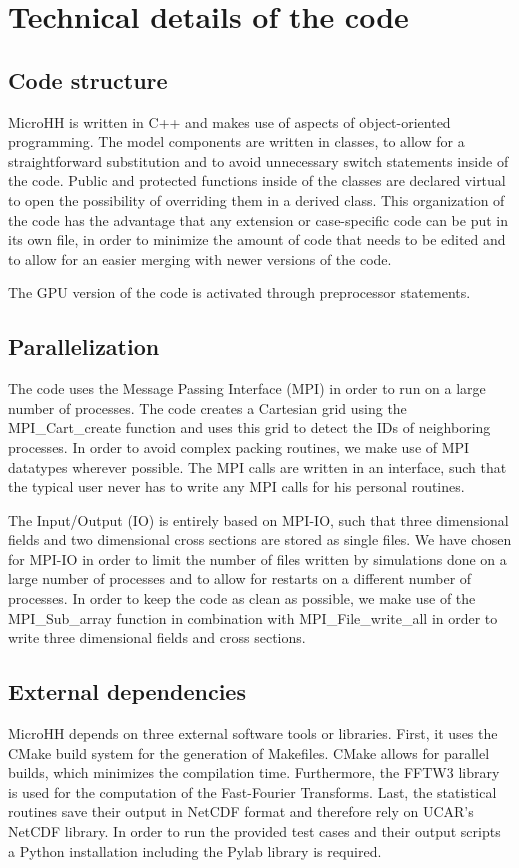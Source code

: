 \documentclass[gmd]{copernicus}
\begin{document}
\section{Technical details of the code}\label{sec:technical}
\subsection{Code structure}
MicroHH is written in C++ and makes use of aspects of object-oriented programming. The model components are written in classes, to allow for a straightforward substitution and to avoid unnecessary switch statements inside of the code. Public and protected functions inside of the classes are declared virtual to open the possibility of overriding them in a derived class. This organization of the code has the advantage that any extension or case-specific code can be put in its own file, in order to minimize the amount of code that needs to be edited and to allow for an easier merging with newer versions of the code.

The GPU version of the code is activated through preprocessor statements. 

\subsection{Parallelization}
The code uses the Message Passing Interface (MPI) in order to run on a large number of processes. The code creates a Cartesian grid using the MPI\_Cart\_create function and uses this grid to detect the IDs of neighboring processes. In order to avoid complex packing routines, we make use of MPI datatypes wherever possible. The MPI calls are written in an interface, such that the typical user never has to write any MPI calls for his personal routines.

The Input/Output (IO) is entirely based on MPI-IO, such that three dimensional fields and two dimensional cross sections are stored as single files. We have chosen for MPI-IO in order to limit the number of files written by simulations done on a large number of processes and to allow for restarts on a different number of processes. In order to keep the code as clean as possible, we make use of the MPI\_Sub\_array function in combination with MPI\_File\_write\_all in order to write three dimensional fields and cross sections.


\subsection{External dependencies}
MicroHH depends on three external software tools or libraries. First, it uses the CMake build system for the generation of Makefiles. CMake allows for parallel builds, which minimizes the compilation time. Furthermore, the FFTW3 library \citep{Frigo2005} is used for the computation of the Fast-Fourier Transforms. Last, the statistical routines save their output in NetCDF format and therefore rely on UCAR's NetCDF library. In order to run the provided test cases and their output scripts a Python installation including the Pylab library is required.
\end{document}
